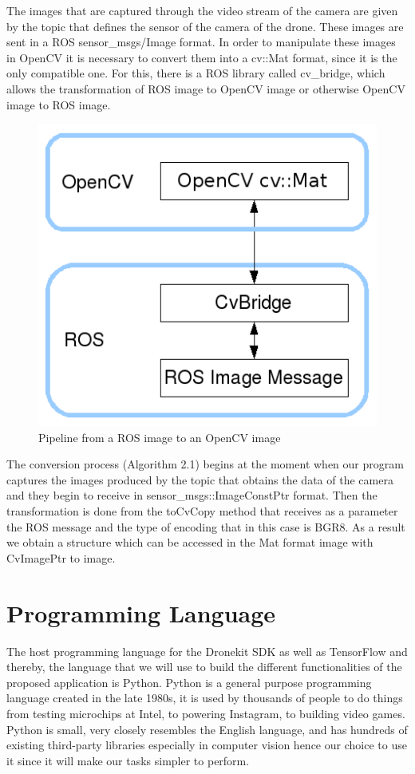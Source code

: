 The images that are captured through the video stream of the camera are given by the topic that defines the sensor of the camera of the drone. These images are sent in a ROS sensor\_msgs/Image format. In order to manipulate these images in OpenCV it is necessary to convert them into a cv::Mat format, since it is the only compatible one. For this, there is a ROS library called cv\_bridge, which allows the transformation of ROS image to OpenCV image or otherwise OpenCV image to ROS image.


\begin{figure}[h!]
\centering
\includegraphics[scale=0.6]{figures/cv_bridge.png}
\caption{Pipeline from a ROS image to an OpenCV image}
\end{figure}

The conversion process (Algorithm 2.1) begins at the moment when our program captures the images produced by the topic that obtains the data of the camera and they begin to receive in sensor\_msgs::ImageConstPtr format. Then the transformation is done from the toCvCopy method that receives as a parameter the ROS message and the type of encoding that in this case is BGR8. As a result we obtain a structure which can be accessed in the Mat format image with CvImagePtr to image.


\section{Programming Language}

The host programming language for the Dronekit SDK as well as TensorFlow and thereby, the language that we will use to build the different functionalities of the proposed application is Python.  Python is a general purpose programming language created in the late 1980s, it is used by thousands of people to do things from testing microchips at Intel, to powering Instagram, to building video games. Python is small, very closely resembles the English language, and has hundreds of existing third-party libraries especially in computer vision hence our choice to use it since it will make our tasks simpler to perform.

